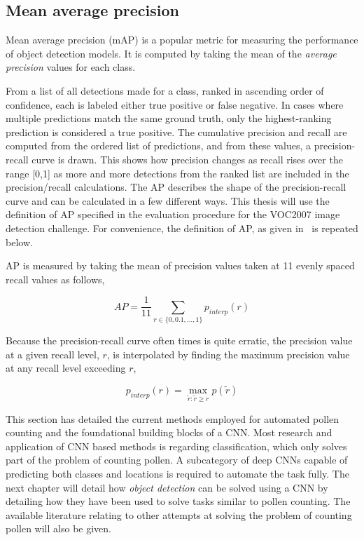 \subsection{Mean average precision}
Mean average precision (mAP) is a popular metric for measuring the performance of object detection models.
It is computed by taking the mean of the \textit{average precision} values for each class.

From a list of all detections made for a class, ranked in ascending order of confidence, each is labeled either true positive or false negative.
In cases where multiple predictions match the same ground truth, only the highest-ranking prediction is considered a true positive.
The cumulative precision and recall are computed from the ordered list of predictions, and from these values, a precision-recall curve is drawn.
This shows how precision changes as recall rises over the range [0,1] as more and more detections from the ranked list are included in the precision/recall calculations.
The AP describes the shape of the precision-recall curve and can be calculated in a few different ways.
This thesis will use the definition of AP specified in the evaluation procedure for the VOC2007 image detection challenge.
For convenience, the definition of AP, as given in\ \textcite{everingham2010pascal} is repeated below.

AP is measured by taking the mean of precision values taken at 11 evenly spaced recall values as follows,

\begin{equation}\label{eq:average-precision}
  AP=\frac{1}{11} \sum_{r\in \{0,0.1,\dots,1\}}p_{interp}(r)
\end{equation}

Because the precision-recall curve often times is quite erratic, the precision value at a given recall level, \(r\), is interpolated by finding the maximum precision value at any recall level exceeding \(r\),

\begin{equation*}
  p_{interp}(r)=\max_{\tilde{r}:\tilde{r}\geq r}p(\tilde{r})
\end{equation*}

This section has detailed the current methods employed for automated pollen counting and the foundational building blocks of a CNN\@.
Most research and application of CNN based methods is regarding classification, which only solves part of the problem of counting pollen.
A subcategory of deep CNNs capable of predicting both classes and locations is required to automate the task fully.
The next chapter will detail how \textit{object detection} can be solved using a CNN by detailing how they have been used to solve tasks similar to pollen counting.
The available literature relating to other attempts at solving the problem of counting pollen will also be given.


